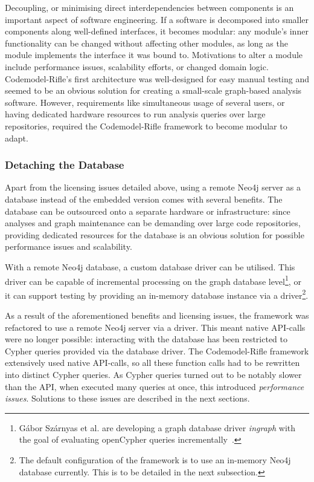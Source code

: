 Decoupling, or minimising direct interdependencies between components is an important aspect of software engineering. If a software is decomposed into smaller components along well-defined interfaces, it becomes modular: any module's inner functionality can be changed without affecting other modules, as long as the module implements the interface it was bound to. Motivations to alter a module include performance issues, scalability efforts, or changed domain logic. Codemodel-Rifle's first architecture was well-designed for easy manual testing and seemed to be an obvious solution for creating a small-scale graph-based analysis software. However, requirements like simultaneous usage of several users, or having dedicated hardware resources to run analysis queries over large repositories, required the Codemodel-Rifle framework to become modular to adapt.


\subsubsection{Detaching the Database}

Apart from the licensing issues detailed above, using a remote Neo4j server as a database instead of the embedded version comes with several benefits. The database can be outsourced onto a separate hardware or infrastructure: since analyses and graph maintenance can be demanding over large code repositories, providing dedicated resources for the database is an obvious solution for possible performance issues and scalability.

With a remote Neo4j database, a custom database driver can be utilised. This driver can be capable of incremental processing on the graph database level\footnote{Gábor Szárnyas et al. are developing a graph database driver \emph{ingraph} with the goal of evaluating openCypher queries incrementally~\cite{ingraph-github}.}, or it can support testing by providing an in-memory database instance via a driver\footnote{The default configuration of the framework is to use an in-memory Neo4j database currently. This is to be detailed in the next subsection.}.

As a result of the aforementioned benefits and licensing issues, the framework was refactored to use a remote Neo4j server via a driver. This meant native API-calls were no longer possible: interacting with the database has been restricted to Cypher queries provided via the database driver. The Codemodel-Rifle framework extensively used native API-calls, so all these function calls had to be rewritten into distinct Cypher queries. As Cypher queries turned out to be notably slower than the API, when executed many queries at once, this introduced \emph{performance issues}. Solutions to these issues are described in the next sections.


